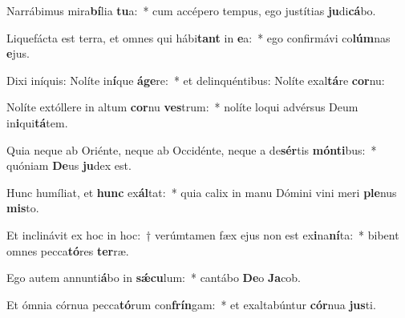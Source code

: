 \item Narrábimus mira\textbf{bí}lia \textbf{tu}a:~* cum accépero tempus, ego justítias \textbf{ju}di\textbf{cá}bo.
\item Liquefácta est terra, et omnes qui hábi\textbf{tant} in \textbf{e}a:~* ego confirmávi co\textbf{lúm}nas \textbf{e}jus.
\item Dixi iníquis: Nolíte in\textbf{í}que \textbf{á}\textbf{ge}re:~* et delinquéntibus: Nolíte exal\textbf{tá}re \textbf{cor}nu:
\item Nolíte extóllere in altum \textbf{cor}nu \textbf{ves}trum:~* nolíte loqui advérsus Deum in\textbf{i}qui\textbf{tá}tem.
\item Quia neque ab Oriénte, neque ab Occidénte, neque a de\textbf{sér}tis \textbf{món}\textbf{ti}bus:~* quóniam \textbf{De}us \textbf{ju}dex est.
\item Hunc humíliat, et \textbf{hunc} ex\textbf{ál}tat:~* quia calix in manu Dómini vini meri \textbf{ple}nus \textbf{mis}to.
\item Et inclinávit ex hoc in hoc:~† verúmtamen fæx ejus non est ex\textbf{i}na\textbf{ní}ta:~* bibent omnes pecca\textbf{tó}res \textbf{ter}ræ.
\item Ego autem annunti\textbf{á}bo in \textbf{sǽ}\textbf{cu}lum:~* cantábo \textbf{De}o \textbf{Ja}cob.
\item Et ómnia córnua pecca\textbf{tó}rum con\textbf{frín}gam:~* et exaltabúntur \textbf{cór}nua \textbf{jus}ti.

